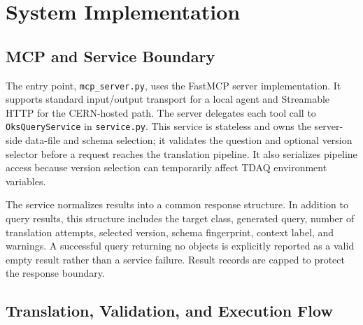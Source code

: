 \documentclass[12pt, a4paper]{report}
\begin{document}
\section{System Implementation}

\subsection{MCP and Service Boundary}

The entry point, \texttt{mcp\_server.py}, uses the FastMCP server implementation. It supports standard input/output transport for a local agent and Streamable HTTP for the CERN-hosted path. The server delegates each tool call to \texttt{OksQueryService} in \texttt{service.py}. This service is stateless and owns the server-side data-file and schema selection; it validates the question and optional version selector before a request reaches the translation pipeline. It also serializes pipeline access because version selection can temporarily affect TDAQ environment variables.

The service normalizes results into a common response structure. In addition to query results, this structure includes the target class, generated query, number of translation attempts, selected version, schema fingerprint, context label, and warnings. A successful query returning no objects is explicitly reported as a valid empty result rather than a service failure. Result records are capped to protect the response boundary.

\subsection{Translation, Validation, and Execution Flow}
\end{document}
